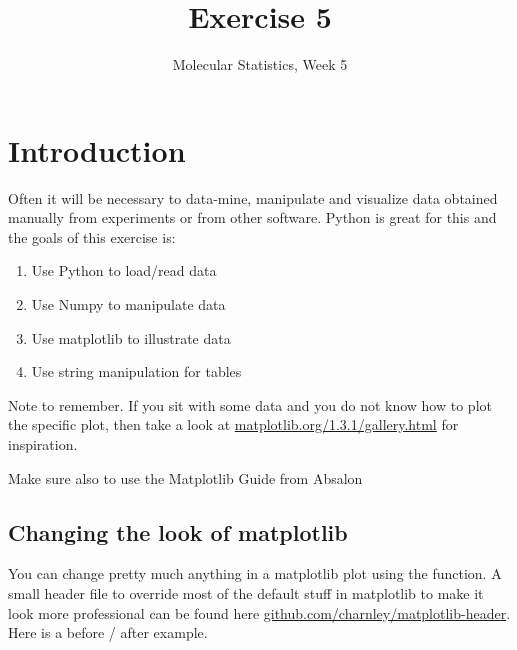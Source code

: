 \documentclass{article}
\title{Exercise 5}
\author{Molecular Statistics, Week 5}
\date{}
\begin{document}

\maketitle

\section{Introduction}

Often it will be necessary to data-mine, manipulate and visualize data obtained manually from experiments or from other software.
Python is great for this and the goals of this exercise is:

\begin{enumerate}
    \item Use Python to load/read data

    \item Use Numpy to manipulate data

    \item Use matplotlib to illustrate data

    \item Use string manipulation for tables

\end{enumerate}


Note to remember.
If you sit with some data and you do not know how to plot the specific plot, then take a look at
\href{http://matplotlib.org/1.3.1/gallery.html}{matplotlib.org/1.3.1/gallery.html} for inspiration.

Make sure also to use the Matplotlib Guide from Absalon

\subsection{Changing the look of matplotlib}
You can change pretty much anything in a matplotlib plot using the  function.
A small header file to override most of the default stuff in matplotlib to make it look more professional can be found here
\href{https://github.com/charnley/matplotlib-header}{github.com/charnley/matplotlib-header}.
Here is a before / after example.
\end{document}
